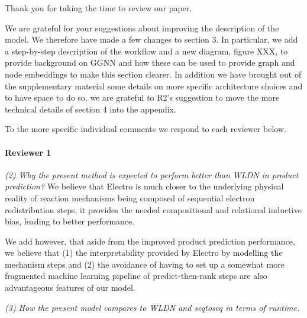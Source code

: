 \documentclass{article}
\begin{document}


Thank you for taking the time to review our paper. 


We are grateful for your suggestions about improving the description of the model. We therefore have made a few changes to section 3.
In particular, we add a step-by-step description of the workflow and a new diagram, figure XXX, to provide background on GGNN and how these can be used to provide graph and node embeddings to make this section clearer. 
In addition we have brought out of the supplementary material some details on more specific architecture choices and to have space to do so, we are grateful to R2's suggestion to move the more technical details of section 4 into the appendix.

To the more specific individual comments we respond to each reviewer below.



\paragraph{Reviewer 1}

\emph{(2) Why the present method is expected to perform better than WLDN in product prediction?}
We believe that Electro is much closer to the underlying physical reality of reaction mechanisms being composed of sequential electron redistribution steps, it provides the needed compositional and relational inductive bias, leading to better performance.

We add however, that aside from the improved product prediction performance, we believe that  (1) the interpretability provided by Electro by modelling the mechanism steps and (2) the avoidance of having to set up a somewhat more fragmented machine learning pipeline of predict-then-rank steps are also advantageous features of our model.

\emph{(3) How the present model compares to WLDN and seqtoseq in terms of runtime.}
\end{document}
